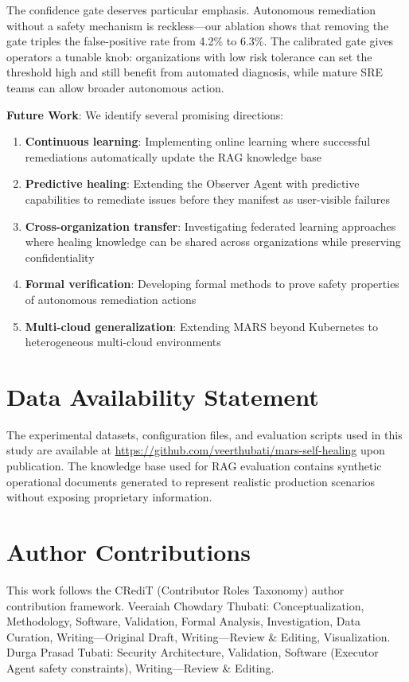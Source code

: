 \documentclass[journal]{IEEEtran}
\begin{document}
The confidence gate deserves particular emphasis. Autonomous remediation without a safety mechanism is reckless---our ablation shows that removing the gate triples the false-positive rate from 4.2\% to 6.3\%. The calibrated gate gives operators a tunable knob: organizations with low risk tolerance can set the threshold high and still benefit from automated diagnosis, while mature SRE teams can allow broader autonomous action.

\textbf{Future Work}: We identify several promising directions:
\begin{enumerate}
    \item \textbf{Continuous learning}: Implementing online learning where successful remediations automatically update the RAG knowledge base
    \item \textbf{Predictive healing}: Extending the Observer Agent with predictive capabilities to remediate issues before they manifest as user-visible failures
    \item \textbf{Cross-organization transfer}: Investigating federated learning approaches where healing knowledge can be shared across organizations while preserving confidentiality
    \item \textbf{Formal verification}: Developing formal methods to prove safety properties of autonomous remediation actions
    \item \textbf{Multi-cloud generalization}: Extending MARS beyond Kubernetes to heterogeneous multi-cloud environments
\end{enumerate}

\section*{Data Availability Statement}
The experimental datasets, configuration files, and evaluation scripts used in this study are available at \url{https://github.com/veerthubati/mars-self-healing} upon publication. The knowledge base used for RAG evaluation contains synthetic operational documents generated to represent realistic production scenarios without exposing proprietary information.

\section*{Author Contributions}
This work follows the CRediT (Contributor Roles Taxonomy) author contribution framework. Veeraiah Chowdary Thubati: Conceptualization, Methodology, Software, Validation, Formal Analysis, Investigation, Data Curation, Writing—Original Draft, Writing—Review \& Editing, Visualization. Durga Prasad Tubati: Security Architecture, Validation, Software (Executor Agent safety constraints), Writing—Review \& Editing.
\end{document}

